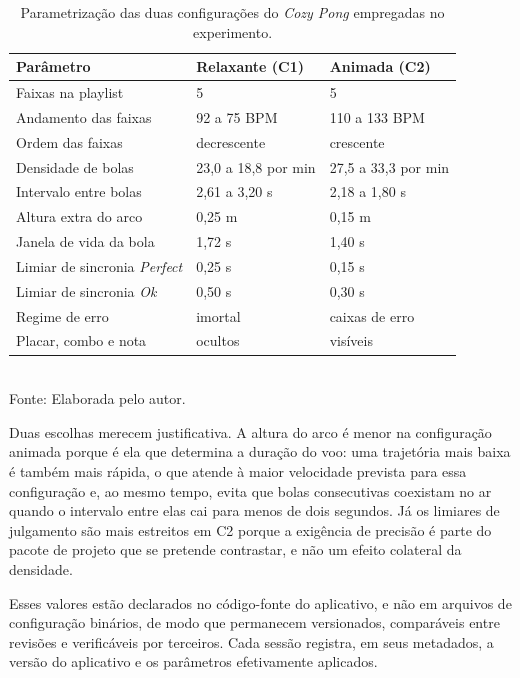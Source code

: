 \begin{table}[H]
    \centering
    \caption{Parametrização das duas configurações do \textit{Cozy Pong} empregadas no experimento.}
    \label{tab:parametros}
    \small
    \begin{tabularx}{\textwidth}{p{5.2cm}YY}
        \toprule
        \textbf{Parâmetro} & \textbf{Relaxante (C1)} & \textbf{Animada (C2)} \\
        \midrule
        Faixas na playlist & 5 & 5 \\
        Andamento das faixas & 92 a 75 BPM & 110 a 133 BPM \\
        Ordem das faixas & decrescente & crescente \\
        Densidade de bolas & 23,0 a 18,8 por min & 27,5 a 33,3 por min \\
        Intervalo entre bolas & 2,61 a 3,20 s & 2,18 a 1,80 s \\
        Altura extra do arco & 0,25 m & 0,15 m \\
        Janela de vida da bola & 1,72 s & 1,40 s \\
        Limiar de sincronia \textit{Perfect} & 0,25 s & 0,15 s \\
        Limiar de sincronia \textit{Ok} & 0,50 s & 0,30 s \\
        Regime de erro & imortal & caixas de erro \\
        Placar, combo e nota & ocultos & visíveis \\
        \bottomrule
    \end{tabularx}\\[2pt]
    {\footnotesize Fonte: Elaborada pelo autor.}
\end{table}

Duas escolhas merecem justificativa. A altura do arco é menor na configuração animada porque é ela que determina a duração do voo: uma trajetória mais baixa é também mais rápida, o que atende à maior velocidade prevista para essa configuração e, ao mesmo tempo, evita que bolas consecutivas coexistam no ar quando o intervalo entre elas cai para menos de dois segundos. Já os limiares de julgamento são mais estreitos em C2 porque a exigência de precisão é parte do pacote de projeto que se pretende contrastar, e não um efeito colateral da densidade.

Esses valores estão declarados no código-fonte do aplicativo, e não em arquivos de configuração binários, de modo que permanecem versionados, comparáveis entre revisões e verificáveis por terceiros. Cada sessão registra, em seus metadados, a versão do aplicativo e os parâmetros efetivamente aplicados.

